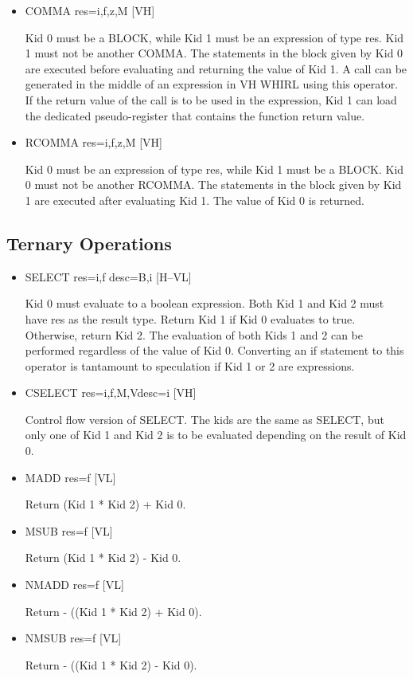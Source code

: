 \begin{itemize}
\item
{}%
COMMA res=i,f,z,M \hfill [VH]

Kid 0 must be a
%
BLOCK, while Kid 1 must be an expression of type
res. Kid 1 must not be another
%
COMMA. The statements in the block given by
Kid 0 are executed before evaluating and returning the value of
Kid 1. A call can be generated in the middle of an expression in VH
WHIRL using this operator. If the return value of the call is to
be used in the expression, Kid 1 can load the dedicated pseudo-register
that contains the function return value. 

\item
{}%
RCOMMA res=i,f,z,M \hfill [VH]

Kid 0 must be an expression of type res, while Kid 1 must be a
%
BLOCK. Kid 0 must not be another
%
RCOMMA. The statements in the block given by Kid 1 are executed
after evaluating Kid 1. The value of Kid 0 is returned.
\end{itemize}

\subsection{Ternary Operations}

\begin{itemize}
\item
{}%
SELECT res=i,f desc=B,i \hfill [H--VL]

Kid 0 must evaluate to a boolean expression. Both Kid 1 and Kid 2
must have res as the result type. Return Kid 1 if Kid 0 evaluates
to true. Otherwise, return Kid 2. The evaluation of both Kids 1
and 2 can be performed regardless of the value of Kid 0. Converting
an if statement to this operator is tantamount to speculation if
Kid 1 or 2 are expressions. 

\item
{}%
CSELECT res=i,f,M,Vdesc=i \hfill [VH]

Control flow version of
%
SELECT. The kids are the same as
%
SELECT,
but only one of Kid 1 and Kid 2 is to be evaluated depending on the
result of
Kid 0. 

\item
{}%
MADD res=f [VL]

Return (Kid 1 * Kid 2) + Kid 0.

\item
{}%
MSUB res=f [VL]

Return (Kid 1 * Kid 2) - Kid 0.

\item
{}%
NMADD res=f [VL]

Return - ((Kid 1 * Kid 2) + Kid 0).

\item
{}%
NMSUB res=f [VL]

Return - ((Kid 1 * Kid 2) - Kid 0).
\end{itemize}

